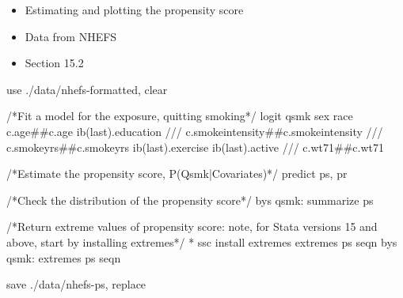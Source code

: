 \documentclass[
  10pt,
  a4paper,
]{book}
\newenvironment{Shaded}{\begin{snugshade}}{\end{snugshade}}
\newcommand{\CommentTok}[1]{\textcolor[rgb]{0.37,0.37,0.37}{#1}}
\newcommand{\FunctionTok}[1]{\textcolor[rgb]{0.28,0.35,0.67}{#1}}
\newcommand{\KeywordTok}[1]{\textcolor[rgb]{0.00,0.46,0.62}{#1}}
\newcommand{\NormalTok}[1]{\textcolor[rgb]{0.00,0.46,0.62}{#1}}
\providecommand{\tightlist}{%
  \setlength{\itemsep}{0pt}\setlength{\parskip}{0pt}}
\begin{document}
\begin{itemize}
\tightlist
\item
  Estimating and plotting the propensity score
\item
  Data from NHEFS
\item
  Section 15.2
\end{itemize}

\begin{Shaded}
\begin{Highlighting}[]
\KeywordTok{use}\NormalTok{ ./}\KeywordTok{data}\NormalTok{/nhefs{-}formatted, }\KeywordTok{clear}

\CommentTok{/*Fit a model for the exposure, quitting smoking*/}
\KeywordTok{logit}\NormalTok{ qsmk sex race c.age\#\#c.age ib(}\FunctionTok{last}\NormalTok{).education }\CommentTok{///}
\NormalTok{  c.smokeintensity\#\#c.smokeintensity }\CommentTok{///}
\NormalTok{  c.smokeyrs\#\#c.smokeyrs ib(}\FunctionTok{last}\NormalTok{).exercise ib(}\FunctionTok{last}\NormalTok{).active }\CommentTok{///}
\NormalTok{  c.wt71\#\#c.wt71 }

\CommentTok{/*Estimate the propensity score, P(Qsmk|Covariates)*/}
\KeywordTok{predict}\NormalTok{ ps, pr}

\CommentTok{/*Check the distribution of the propensity score*/}
\KeywordTok{bys}\NormalTok{ qsmk: }\KeywordTok{summarize}\NormalTok{ ps }

\CommentTok{/*Return extreme values of propensity score:}
\CommentTok{  note, for Stata versions 15 and above, start by installing extremes*/}
\NormalTok{* }\KeywordTok{ssc}\NormalTok{ install extremes}
\NormalTok{extremes ps seqn}
\KeywordTok{bys}\NormalTok{ qsmk: extremes ps seqn}

\KeywordTok{save}\NormalTok{ ./}\KeywordTok{data}\NormalTok{/nhefs{-}ps, }\KeywordTok{replace}


\end{Highlighting}
\end{Shaded}
\end{document}
